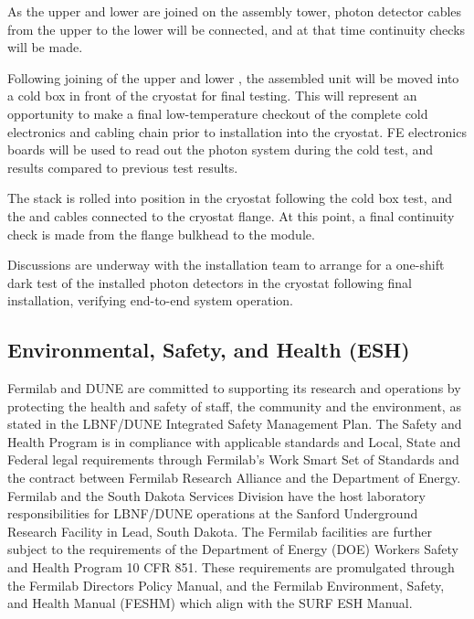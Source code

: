 As the upper and lower  are joined on the assembly tower, photon detector cables from the upper to the lower  will be connected, and at that time continuity checks will be made.

Following joining of the upper and lower , the assembled unit will be moved into a cold box in front of the cryostat for final testing.  This will represent an opportunity to make a final low-temperature checkout of the complete  cold electronics and cabling chain prior to installation into the cryostat.   FE electronics boards will be used to read out the photon system during the cold test, and results compared to previous  test results.

The  stack is rolled into position in the cryostat following the cold box test, and the  and  cables connected to the cryostat flange.  At this point, a final continuity check is made from the flange bulkhead to the  module.

Discussions are underway with the installation team to arrange for a one-shift dark test of the installed photon detectors in the cryostat following final installation, verifying end-to-end system operation.



\subsection{Environmental, Safety, and Health (ESH)}
\label{sec:fdsp-tc-inst-safety}

Fermilab and DUNE are committed to supporting its research and operations by protecting the health and safety of staff, the community and the environment, as stated in the LBNF/DUNE Integrated Safety Management Plan. The Safety and Health Program is in compliance with applicable standards and Local, State and Federal legal requirements through Fermilab's Work Smart Set of Standards and the contract between Fermilab Research Alliance and the Department of Energy. Fermilab and the South Dakota Services Division have the host laboratory responsibilities for LBNF/DUNE operations at the Sanford Underground Research Facility in Lead, South Dakota.
The Fermilab facilities are further subject to the requirements of the Department of Energy (DOE) Workers Safety and Health Program 10 CFR 851. These requirements are promulgated through the Fermilab Directors Policy Manual, and the Fermilab Environment, Safety, and Health Manual (FESHM) which align with the SURF ESH Manual.

